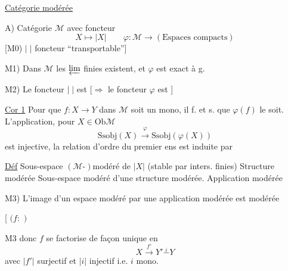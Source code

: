 \uline{Catégorie modérée}

A) Catégorie $\mathcal M$ avec foncteur
\[
X\longmapsto|X|\qquad
\varphi:\mathcal M\longrightarrow(\text{Espaces compacts})
\]
[M0) $|\;|$ foncteur ``transportable'']

M1) \deleted{$\unsure{\varphi}$} Dans $\mathcal M$ les $\varprojlim$ finies existent, et $\varphi$ est exact à g.

M2) Le foncteur $|\;|$ \deleted{$\unsure{\varphi}$} est 
[$\Longrightarrow$ le foncteur $\varphi$ est ]

\uline{Cor 1} Pour que $f:X\to Y$ dans $\mathcal M$ soit un mono, il f. et s. que $\varphi(f)$ le soit. L'application, pour $X\in\mathrm{Ob}\mathcal M$
\[
\mathrm{Ssobj}(X)\xrightarrow{\varphi}\mathrm{Ssobj}(\varphi(X))
\]
est injective, la relation d'ordre du premier ens est induite par 

\uline{Déf} Sous-espace $(\mathcal M\text{-})$modéré de $|X|$ (stable par inters. finies)
Structure modérée  Sous-espace modéré d'une structure modérée. Application modérée


M3) L'image d'un espace modéré par une application modérée est modérée

[
$(f:$
$)$

M3 donc $f$ se factorise de façon  unique en
\[
X\xrightarrow{f'}Y'\overset{i}{-}Y
\]
avec $|f'|$ surjectif et $|i|$ injectif i.e. $i$ mono.

